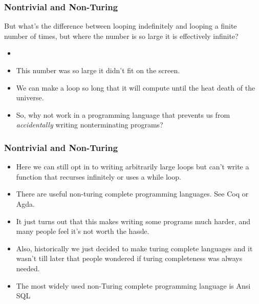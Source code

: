 \documentclass{beamer}
\begin{document}
\begin{frame}
  \frametitle{Nontrivial and Non-Turing}
  But what's the difference between looping indefinitely and looping a finite number of times, but where the number
  is so large it is effectively infinite?
  \begin{itemize}
  \item<2-> \finiteLoop
  \item<3-> This number was so large it didn't fit on the screen.
  \item<4-> We can make a loop so long that it will compute until the heat death of the universe.
  \item<5-> So, why not work in a programming language that prevents us from \emph{accidentally} writing
    nonterminating programs?
  \end{itemize}
\end{frame}

\begin{frame}
  \frametitle{Nontrivial and Non-Turing}
  \begin{itemize}
  \item<2-> Here we can still opt in to writing arbitrarily large loops but can't write a function that recurses
    infinitely or uses a while loop.
  \item<3-> There are useful non-turing complete programming languages. See Coq or Agda.
  \item<4-> It just turns out that this makes writing some programs much harder, and many people feel it's not worth the hassle.
  \item<5-> Also, historically we just decided to make turing complete languages and it wasn't till later that people wondered
    if turing completeness was always needed.
  \item<6-> The most widely used non-Turing complete programming language is Ansi SQL
  \end{itemize}
\end{frame}


\end{document}
